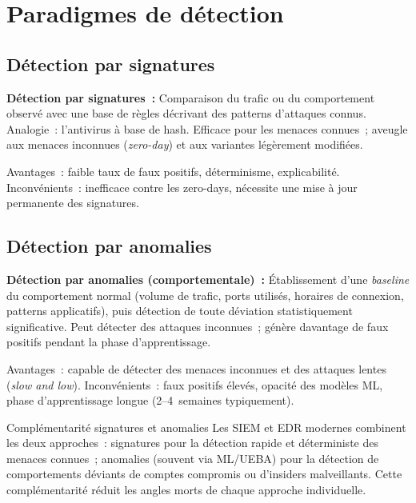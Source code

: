 \section{Paradigmes de détection}
\label{sec:ids-paradigmes}

\subsection{Détection par signatures}

\begin{boxdef}
\textbf{Détection par signatures~:} Comparaison du trafic ou du comportement
observé avec une base de règles décrivant des patterns d'attaques connus.
Analogie~: l'antivirus à base de hash. Efficace pour les menaces connues~;
aveugle aux menaces inconnues (\textit{zero-day}) et aux variantes légèrement
modifiées.
\end{boxdef}

Avantages~: faible taux de faux positifs, déterminisme, explicabilité.
Inconvénients~: inefficace contre les zero-days, nécessite une mise à jour
permanente des signatures.

\subsection{Détection par anomalies}

\begin{boxdef}
\textbf{Détection par anomalies (comportementale)~:} Établissement d'une
\textit{baseline} du comportement normal (volume de trafic, ports utilisés,
horaires de connexion, patterns applicatifs), puis détection de toute déviation
statistiquement significative. Peut détecter des attaques inconnues~; génère
davantage de faux positifs pendant la phase d'apprentissage.
\end{boxdef}

Avantages~: capable de détecter des menaces inconnues et des attaques lentes
(\textit{slow and low}).
Inconvénients~: faux positifs élevés, opacité des modèles ML, phase
d'apprentissage longue (2--4~semaines typiquement).

\begin{boiteRemarque}{Complémentarité signatures et anomalies}
Les SIEM et EDR modernes combinent les deux approches~: signatures pour la
détection rapide et déterministe des menaces connues~; anomalies (souvent
via ML/UEBA) pour la détection de comportements déviants de comptes
compromis ou d'insiders malveillants. Cette complémentarité réduit les angles
morts de chaque approche individuelle.
\end{boiteRemarque}

